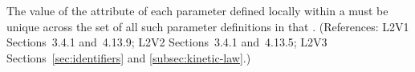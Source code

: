 The value of the  attribute of each parameter defined locally within
a \KineticLaw must be unique across the set of all such parameter
definitions in that \KineticLaw.  (References: L2V1 Sections~3.4.1 and~4.13.9;
L2V2 Sections~3.4.1 and~4.13.5;
L2V3 Sections~\ref{sec:identifiers} and \ref{subsec:kinetic-law}.)
